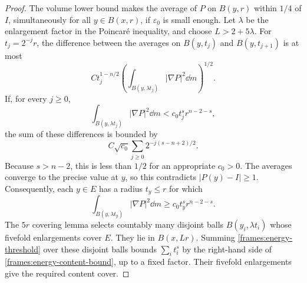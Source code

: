 \begin{proof}
 The volume lower bound makes the average of $P$ on $B(y,r)$ within
 $1/4$ of $I$, simultaneously for all $y\in B(x,r)$, if
 $\varepsilon_0$ is small enough.  Let $\lambda$ be the enlargement
 factor in the Poincar\'e inequality, and choose $L>2+5\lambda$.
 For $t_j=2^{-j}r$, the difference between the averages on
 $B(y,t_j)$ and $B(y,t_{j+1})$ is at most
 \[
  C t_j^{1-n/2}
       \left(\int_{B(y,\lambda t_j)}|\nabla P|^2\dd m\right)^{1/2}.
 \]
 If, for every $j\geq0$,
 \[
  \int_{B(y,\lambda t_j)}|\nabla P|^2\dd m
       <c_0t_j^s r^{n-2-s},
 \]
 the sum of these differences is bounded by
 \[
  C\sqrt{c_0}\sum_{j\geq0}2^{-j(s-n+2)/2}.
 \]
 Because $s>n-2$, this is less than $1/2$ for an appropriate $c_0>0$.
 The averages converge to the precise value at $y$, so this
 contradicts $|P(y)-I|\geq1$.
 Consequently, each $y\in E$ has a radius $t_y\leq r$ for which
 \begin{equation}\label{frames:energy-threshold}
  \int_{B(y,\lambda t_y)}|\nabla P|^2\dd m
       \geq c_0t_y^s r^{n-2-s}.
 \end{equation}
 The $5r$ covering lemma selects countably many disjoint balls
 $B(y_i,\lambda t_i)$ whose fivefold enlargements cover $E$.
 They lie in $B(x,Lr)$.  Summing
 \eqref{frames:energy-threshold} over these disjoint balls bounds
 $\sum_i t_i^s$ by the right-hand side of
 \eqref{frames:energy-content-bound}, up to a fixed factor.
 Their fivefold enlargements give the required content cover.
\end{proof}


